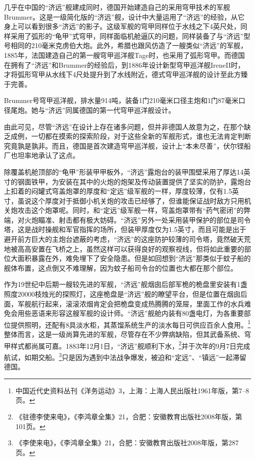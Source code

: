 \documentclass[12pt,UTF8]{ctexbook}
\begin{document}
几乎在中国的“济远”舰建成同时，德国开始建造自己的采用穹甲技术的军舰Brummer。这是一级简化版的“济远”舰，设计中大量运用了“济远”的经验，从它身上可以看到很多“济远”的影子。这级军舰的穹甲同样位于水线之下4英尺处，同样采用了弧形的“龟甲”式穹甲，同样面临机舱逼仄的问题，同样装备了与“济远”型号相同的210毫米克虏伯大炮。此外，希腊也跟风仿造了一艘类似“济远”的军舰，1885年，法国建造自己的第一艘穹甲巡洋舰Tage时，也采用了弧形穹甲。而德国在拥有了“济远”和Brummer的经验后，到1886年设计新型穹甲巡洋舰IreneII时，才将弧形穹甲从水线下4尺处提升到了水线附近，德式穹甲巡洋舰的设计至此方臻于完善。

Brummer号穹甲巡洋舰，排水量914吨，装备1门210毫米口径主炮和1门87毫米口径尾炮。她与“济远”同属德国的第一代穹甲巡洋舰设计。

由此可见，尽管“济远”在设计上存在诸多问题，但并非德国人故意为之，在那个缺乏成例，一切都在摸索的探索阶段，对于这些全新的军舰形式，谁也无法肯定判断究竟孰是孰非。而且，德国是首次建造穹甲巡洋舰，设计上“本未尽善”，伏尔铿船厂也坦率地承认了这点。

除覆盖机舱顶部的“龟甲”形装甲甲板外，“济远”露炮台的装甲围壁采用了厚达14英寸的钢面铁甲，为安装在其中的火炮的炮架及传动装置提供了坚实的防护，露炮台上扣着的闷罐式穹盖炮罩的厚度和“定远”级军舰的一样，厚度较薄，仅有1.5英寸，虽说这个厚度对于抵御小机关炮的攻击已经够了，但谁能保证战时敌方只用机关炮攻击这个炮罩呢。同时，和“定远”级军舰一样，穹盖炮罩带有“药气密闭”的弊端，对火炮瞄准、射击都有极大妨碍。“济远”另外一处采用装甲保护的部位是司令塔，这是战时操舰和军官指挥的场所，但装甲厚度仅为1.5英寸，而且可能是出于避开前方巨大的主炮台遮蔽的考虑，“济远”的这座防护较薄的司令塔，竟然破天荒地被高高安置在飞桥之上，虽然这样可以获得良好的观察视线，但将如此重要的部位大面积暴露在外，难免埋下了安全隐患。但是如回想到“济远”那类似于蚊子船的舰体布置，这点倒又不难理解，因为蚊子船司令台的位置也大都在那个部位。

作为19世纪中后期一艘较先进的军舰，“济远”舰烟囱后部军桅的桅盘里安装有1盏照度20000枝烛光的探照灯，这座桅盘是“济远”舰的瞭望平台，但是位置在烟囱后面，军舰航行起来，滚滚浓烟肯定会把桅盘变成热腾腾的笼屉，里面工作的水兵难免会用些恶语来形容这艘军舰的设计师。“济远”舰舱内装有80盏电灯，为各重要部位提供照明，还配有8具淡水柜，其蒸馏系统生产的淡水每日可供应百余人食用。\footnote{中国近代史资料丛刊《洋务运动》3，上海：上海人民出版社1961年版，第7--8页。}整体而言，这是一级尚算先进的军舰，尽管存在不少弊病缺陷，但其武备系统、穹甲样式都尚属可嘉。1883年12月1日，“济远”舰顺利下水，\footnote{《驻德李使来电》，《李鸿章全集》21，合肥：安徽教育出版社2008年版，第101页。}并于次年的9月7日完成航试，如期交船。\footnote{《李使来电》，《李鸿章全集》21，合肥：安徽教育出版社2008年版，第287页。}只是因为遇到中法战争爆发，被迫和“定远”、“镇远”一起滞留德国。
\end{document}
